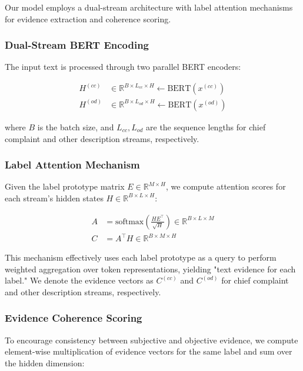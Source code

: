 \documentclass{article}
\begin{document}
Our model employs a dual-stream architecture with label attention mechanisms for evidence extraction and coherence scoring.

\subsubsection{Dual-Stream BERT Encoding}

The input text is processed through two parallel BERT encoders:

\begin{align}
H^{(cc)} &\in \mathbb{R}^{B \times L_{cc} \times H} \leftarrow \text{BERT}(x^{(cc)}) \\
H^{(od)} &\in \mathbb{R}^{B \times L_{od} \times H} \leftarrow \text{BERT}(x^{(od)})
\end{align}

where $B$ is the batch size, and $L_{cc}, L_{od}$ are the sequence lengths for chief complaint and other description streams, respectively.

\subsubsection{Label Attention Mechanism}

Given the label prototype matrix $E \in \mathbb{R}^{M \times H}$, we compute attention scores for each stream's hidden states $H \in \mathbb{R}^{B \times L \times H}$:

\begin{align}
A &= \text{softmax}\left(\frac{H E^\top}{\sqrt{H}}\right) \in \mathbb{R}^{B \times L \times M} \\
C &= A^\top H \in \mathbb{R}^{B \times M \times H}
\end{align}

This mechanism effectively uses each label prototype as a query to perform weighted aggregation over token representations, yielding "text evidence for each label." We denote the evidence vectors as $C^{(cc)}$ and $C^{(od)}$ for chief complaint and other description streams, respectively.

\subsubsection{Evidence Coherence Scoring}

To encourage consistency between subjective and objective evidence, we compute element-wise multiplication of evidence vectors for the same label and sum over the hidden dimension:
\end{document}
